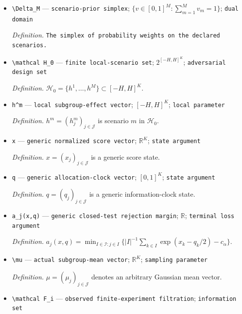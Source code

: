 \documentclass{article}
\begin{document}
\begin{itemize}
  \par\smallskip\noindent\emph{Definition.} \texttt{A second generic scenario label.}
  \item \texttt{\textbackslash{}\allowbreak{}Delta\_\allowbreak{}M} --- \texttt{scenario-\allowbreak{}prior simplex}; \(\{v\in[0,1]^M:\sum_{m=1}^M v_m=1\}\); \texttt{dual domain}
  \par\smallskip\noindent\emph{Definition.} \texttt{The simplex of probability weights on the declared scenarios.}
  \item \texttt{\textbackslash{}\allowbreak{}mathcal H\_\allowbreak{}0} --- \texttt{finite local-\allowbreak{}scenario set}; \(2^{[-H,H]^K}\); \texttt{adversarial design set}
  \par\smallskip\noindent\emph{Definition.} \(\mathcal H_0=\{h^1,\ldots,h^M\}\subset[-H,H]^K\).
  \item \texttt{h\textasciicircum{}m} --- \texttt{local subgroup-\allowbreak{}effect vector}; \([-H,H]^K\); \texttt{local parameter}
  \par\smallskip\noindent\emph{Definition.} \(h^m=(h_j^m)_{j\in\mathcal J}\) is scenario \(m\) in \(\mathcal H_0\).
  \item \texttt{x} --- \texttt{generic normalized score vector}; \(\mathbb R^K\); \texttt{state argument}
  \par\smallskip\noindent\emph{Definition.} \(x=(x_j)_{j\in\mathcal J}\) is a generic score state.
  \item \texttt{q} --- \texttt{generic allocation-\allowbreak{}clock vector}; \([0,1]^K\); \texttt{state argument}
  \par\smallskip\noindent\emph{Definition.} \(q=(q_j)_{j\in\mathcal J}\) is a generic information-clock state.
  \item \texttt{a\_\allowbreak{}j(x,\allowbreak{}q)} --- \texttt{generic closed-\allowbreak{}test rejection margin}; \(\mathbb R\); \texttt{terminal loss argument}
  \par\smallskip\noindent\emph{Definition.} \(a_j(x,q)=\min_{I\in\mathcal I:j\in I}\{|I|^{-1}\sum_{k\in I}\exp(x_k-q_k/2)-c_\alpha\}\).
  \item \texttt{\textbackslash{}\allowbreak{}mu} --- \texttt{actual subgroup-\allowbreak{}mean vector}; \(\mathbb R^K\); \texttt{sampling parameter}
  \par\smallskip\noindent\emph{Definition.} \(\mu=(\mu_j)_{j\in\mathcal J}\) denotes an arbitrary Gaussian mean vector.
  \item \texttt{\textbackslash{}\allowbreak{}mathcal F\_\allowbreak{}i} --- \texttt{observed finite-\allowbreak{}experiment filtration}; \texttt{information set}

\end{itemize}
\end{document}
